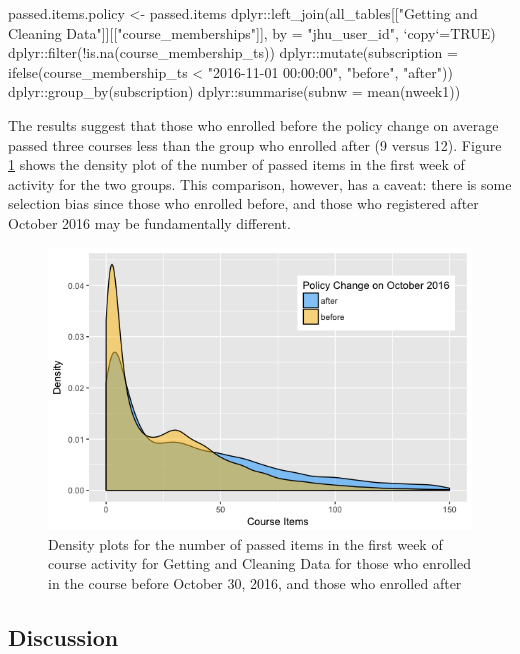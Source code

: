 \begin{Schunk}
\begin{Sinput}
passed.items.policy <- passed.items %
    dplyr::left_join(all_tables[["Getting and Cleaning Data"]][["course_memberships"]], 
                     by = "jhu_user_id", `copy`=TRUE) %
    dplyr::filter(!is.na(course_membership_ts)) %
    dplyr::mutate(subscription = ifelse(course_membership_ts < "2016-11-01 00:00:00", 
                                        "before", "after")) %
    dplyr::group_by(subscription) %
    dplyr::summarise(subnw = mean(nweek1))
\end{Sinput}
\end{Schunk}

The results suggest that those who enrolled before the policy change on
average passed three courses less than the group who enrolled after (9
versus 12). Figure \ref{figure:policy} shows the density plot of the
number of passed items in the first week of activity for the two groups.
This comparison, however, has a caveat: there is some selection bias
since those who enrolled before, and those who registered after October
2016 may be fundamentally different.

\begin{figure}[htbp]
    \centering
    \includegraphics[scale=0.5]{policy}
    \caption{Density plots for the number of passed items in the first week of course activity for Getting and Cleaning Data for those who enrolled in the course before October 30, 2016, and those who enrolled after}
    \label{figure:policy}
\end{figure}

\subsection{Discussion}\label{discussion}

